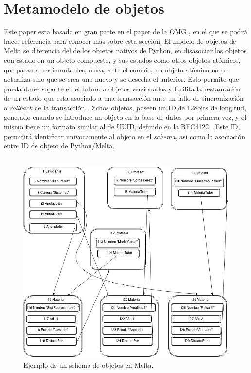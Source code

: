 \documentclass{melta}
\begin{document}
\section{Metamodelo de objetos}
\label{sec:metamodelo}
Este paper esta basado en gran parte en el paper de la OMG \cite{OMG:oodbs}, en el que se podrá hacer referencia para conocer más sobre esta sección. El modelo de objetos de Melta se diferencia del de los objetos nativos de Python, en disasociar los objetos con estado en un objeto compuesto, y sus estados como otros objetos atómicos, que pasan a ser inmutables, o sea, ante el cambio, un objeto atómico no se actualiza sino que se crea uno nuevo y se desecha el anterior. Esto permite que pueda darse soporte en el futuro a objetos versionados y facilita la restauración de un estado que esta asociado a una transacción ante un fallo de sincronización o \textit{rollback} de la transacción.
Dichos objetos, poseen un ID,de 128bits de longitud, generado cuando se introduce un objeto en la base de datos por primera vez, y el mismo tiene un formato similar al de UUID, definido en la RFC4122 \cite{UUID:Leach}. Este ID, permitirá identificar unívocamente al objeto en el \textit{schema}, asi como la asociación entre ID de objeto de Python/Melta.
\\\\
\begin{figure}
\centering
\includegraphics[scale=0.35]{modeloobjetos1}
\caption{Ejemplo de un schema de objetos en Melta.}
\label{melta:modeloObjetos}
\end{figure}
\end{document}
